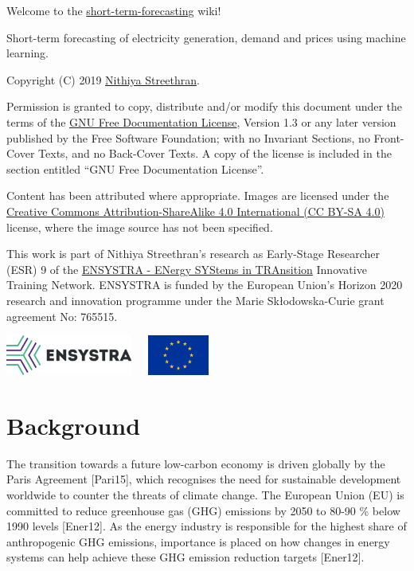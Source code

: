 Welcome to the
\href{https://github.com/ENSYSTRA/short-term-forecasting}{short-term-forecasting}
wiki!

Short-term forecasting of electricity generation, demand and prices
using machine learning.

Copyright (C) 2019 \href{https://nmstreethran.github.io/}{Nithiya
Streethran}.

Permission is granted to copy, distribute and/or modify this document
under the terms of the \href{https://www.gnu.org/licenses/fdl-1.3}{GNU
Free Documentation License}, Version 1.3 or any later version published
by the Free Software Foundation; with no Invariant Sections, no
Front-Cover Texts, and no Back-Cover Texts. A copy of the license is
included in the section entitled ``GNU Free Documentation License''.

Content has been attributed where appropriate. Images are licensed under
the \href{https://creativecommons.org/licenses/by-sa/4.0/}{Creative
Commons Attribution-ShareAlike 4.0 International (CC BY-SA 4.0)}
license, where the image source has not been specified.

This work is part of Nithiya Streethran's research as Early-Stage
Researcher (ESR) 9 of the \href{https://ensystra.eu/}{ENSYSTRA - ENergy
SYStems in TRAnsition} Innovative Training Network. ENSYSTRA is funded
by the European Union's Horizon 2020 research and innovation programme
under the Marie Skłodowska-Curie grant agreement No: 765515.

\href{https://ensystra.eu/}{\includegraphics[width=\textwidth,height=0.52083in]{logos/ensystra-ls.png}}~~~\includegraphics[width=\textwidth,height=0.52083in]{logos/eu.jpg}

\hypertarget{background}{%
\section{Background}\label{background}}

The transition towards a future low-carbon economy is driven globally by
the Paris Agreement {[}Pari15{]}, which recognises the need for
sustainable development worldwide to counter the threats of climate
change. The European Union (EU) is committed to reduce greenhouse gas
(GHG) emissions by 2050 to 80-90 \% below 1990 levels {[}Ener12{]}. As
the energy industry is responsible for the highest share of
anthropogenic GHG emissions, importance is placed on how changes in
energy systems can help achieve these GHG emission reduction targets
{[}Ener12{]}.

